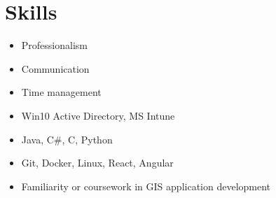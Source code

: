 \section{Skills}
\begin{itemize}
    \item Professionalism
    \item Communication
    \item Time management
    \item Win10 Active Directory, MS Intune
    \item Java, C\#, C, Python
    \item Git, Docker, Linux, React, Angular
    \item Familiarity or coursework in GIS application development
\end{itemize}
